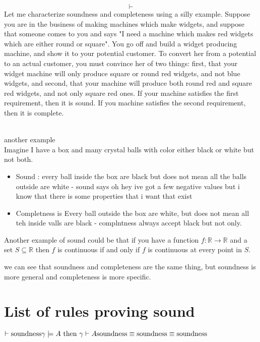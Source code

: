 \documentclass{article}
\theoremstyle{mytheoremstyle}
\theoremstyle{mytheoremstyle}
\theoremstyle{myproblemstyle}
\begin{document}
\[
    \vdash
\]
Let me characterize soundness and completeness using a silly example. Suppose you are in the business of making machines which make widgets, and suppose that someone comes to you and says "I need a machine which makes red widgets which are either round or square". You go off and build a widget producing machine, and show it to your potential customer. To convert her from a potential to an actual customer, you must convince her of two things: first, that your widget machine will only produce square or round red widgets, and not blue widgets, and second, that your machine will produce both round red and square red widgets, and not only square red ones. If your machine satisfies the first requirement, then it is sound. If you machine satisfies the second requirement, then it is complete.

\\
another example
\\
Imagine I have a box and many crystal balls with color either black or white but not both.
\begin{itemize}
    \item Sound : every ball inside the box are black but does not mean all the balls outside are white - sound says oh hey ive got a few negative values but i know that there is some properties that i want that exist
    \item Completness is Every ball outside the box are white, but does not mean all teh inside valls are black - complntness always accept black but not only.
\end{itemize}

Another example of sound could be that if you have a function $f : \mathbb{R} \to \mathbb{R}$ and a set $S \subseteq \mathbb{R}$ then $f$ is continuous if and only if $f$ is continuous at every point in $S$.

we can see that soundness and completeness are the same thing, but soundness is more general and completeness is more specific.

\section{List of rules proving sound}
\begin{math}
    \vdash \text{soundness} \\ \gamma \models A \text{ then } \gamma \vdash A  \\  \text{soundness} \equiv \text{soundness} \equiv \text{soundness}




\end{math}
\end{document}
